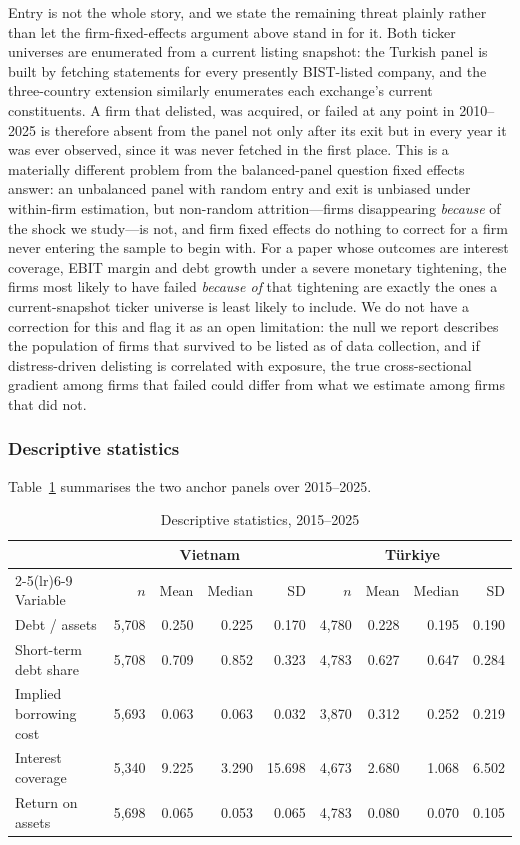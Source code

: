 \documentclass[review,12pt,authoryear]{elsarticle}
\theoremstyle{plain}
\theoremstyle{definition}
\begin{document}
Entry is not the whole story, and we state the remaining threat plainly
rather than let the firm-fixed-effects argument above stand in for it. Both
ticker universes are enumerated from a current listing snapshot: the Turkish
panel is built by fetching statements for every presently BIST-listed company,
and the three-country extension similarly enumerates each exchange's current
constituents. A firm that delisted, was acquired, or failed at any point in
2010--2025 is therefore absent from the panel not only after its exit but in
every year it was ever observed, since it was never fetched in the first
place. This is a materially different problem from the balanced-panel
question fixed effects answer: an unbalanced panel with random entry and exit
is unbiased under within-firm estimation, but non-random attrition---firms
disappearing \emph{because} of the shock we study---is not, and firm fixed
effects do nothing to correct for a firm never entering the sample to begin
with. For a paper whose outcomes are interest coverage, EBIT margin and debt
growth under a severe monetary tightening, the firms most likely to have
failed \emph{because of} that tightening are exactly the ones a
current-snapshot ticker universe is least likely to include. We do not have a
correction for this and flag it as an open limitation: the null we report
describes the population of firms that survived to be listed as of data
collection, and if distress-driven delisting is correlated with exposure, the
true cross-sectional gradient among firms that failed could differ from what
we estimate among firms that did not.

\subsubsection{Descriptive statistics}

Table~\ref{tab:desc} summarises the two anchor panels over 2015--2025.

\begin{table}[htbp]
\centering
\caption{Descriptive statistics, 2015--2025}
\label{tab:desc}
\begin{tabular}{lrrrr@{\hskip 1.5em}rrrr}
\toprule
& \multicolumn{4}{c}{Vietnam} & \multicolumn{4}{c}{T\"{u}rkiye} \\
\cmidrule(lr){2-5}\cmidrule(lr){6-9}
Variable & $n$ & Mean & Median & SD & $n$ & Mean & Median & SD \\
\midrule
Debt / assets            & 5{,}708 & 0.250 & 0.225 & 0.170 & 4{,}780 & 0.228 & 0.195 & 0.190 \\
Short-term debt share    & 5{,}708 & 0.709 & 0.852 & 0.323 & 4{,}783 & 0.627 & 0.647 & 0.284 \\
Implied borrowing cost   & 5{,}693 & 0.063 & 0.063 & 0.032 & 3{,}870 & 0.312 & 0.252 & 0.219 \\
Interest coverage        & 5{,}340 & 9.225 & 3.290 & 15.698 & 4{,}673 & 2.680 & 1.068 & 6.502 \\
Return on assets         & 5{,}698 & 0.065 & 0.053 & 0.065 & 4{,}783 & 0.080 & 0.070 & 0.105 \\
\bottomrule
\end{tabular}
\end{table}
\end{document}
